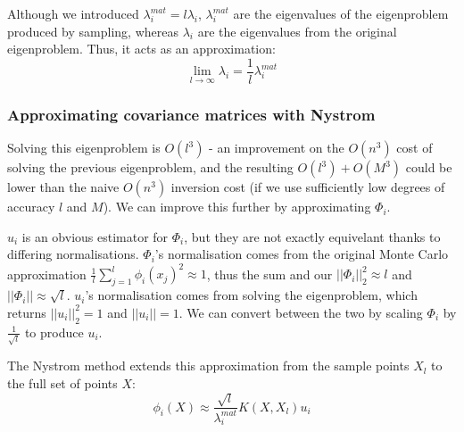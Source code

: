 Although we introduced $\lambda_i^{mat} = l \lambda_i$, $\lambda_i^{mat}$ are the eigenvalues of the eigenproblem produced by sampling, whereas $\lambda_i$ are the eigenvalues from the original eigenproblem. Thus, it acts as an approximation:
\begin{equation*}
    \lim_{l \to \infty} \lambda_i = \frac{1}{l} \lambda_i^{mat} 
\end{equation*}

\subsubsection{Approximating covariance matrices with Nystrom}
Solving this eigenproblem is $O(l^3)$ - an improvement on the $O(n^3)$ cost of solving the previous eigenproblem, and the resulting $O(l^3) + O(M^3)$ could be lower than the naive $O(n^3)$ inversion cost (if we use sufficiently low degrees of accuracy $l$ and $M$). We can improve this further by approximating $\Phi_i$.

$u_i$ is an obvious estimator for $\Phi_i$, but they are not exactly equivelant thanks to differing normalisations. $\Phi_i$'s normalisation comes from the original Monte Carlo approximation $\frac{1}{l} \sum_{j=1}^{l} \phi_i(x_j)^2 \approx 1$, thus the sum and our $||\Phi_i||_2^2 \approx l$ and $||\Phi_i|| \approx \sqrt{l}$. $u_i$'s normalisation comes from solving the eigenproblem, which returns $||u_i||_2^2 = 1$ and $||u_i|| = 1$. We can convert between the two by scaling $\Phi_i$ by $\frac{1}{\sqrt{l}}$ to produce $u_i$.

The Nystrom method \cite{nystrom} extends this approximation from the sample points $X_l$ to the full set of points $X$:
\begin{equation*}
    \phi_i(X) \approx \frac{\sqrt{l}}{\lambda_i^{mat}} K(X, X_l) u_i
\end{equation*}

